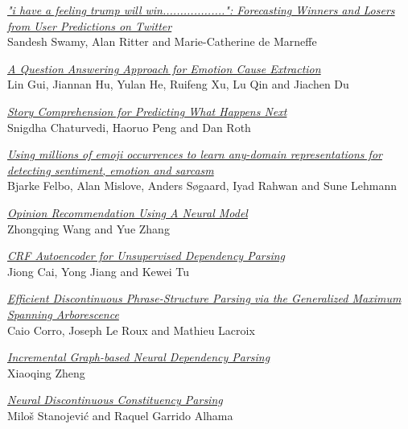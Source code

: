 \hyperlink{page.1582}{\em "i have a feeling trump will win..................": Forecasting Winners and Losers from User Predictions on Twitter}\samepage \\
\hspace*{7mm} Sandesh Swamy, Alan Ritter and Marie-Catherine de Marneffe\dotfill {}

\hyperlink{page.1592}{\em A Question Answering Approach for Emotion Cause Extraction}\samepage \\
\hspace*{7mm} Lin Gui, Jiannan Hu, Yulan He, Ruifeng Xu, Lu Qin and Jiachen Du\dotfill {}

\hyperlink{page.1602}{\em Story Comprehension for Predicting What Happens Next}\samepage \\
\hspace*{7mm} Snigdha Chaturvedi, Haoruo Peng and Dan Roth\dotfill {}

\hyperlink{page.1614}{\em Using millions of emoji occurrences to learn any-domain representations for detecting sentiment, emotion and sarcasm}\samepage \\
\hspace*{7mm} Bjarke Felbo, Alan Mislove, Anders S{\o}gaard, Iyad Rahwan and Sune Lehmann\dotfill {}

\hyperlink{page.1625}{\em Opinion Recommendation Using A Neural Model}\samepage \\
\hspace*{7mm} Zhongqing Wang and Yue Zhang\dotfill {}

\hyperlink{page.1637}{\em CRF Autoencoder for Unsupervised Dependency Parsing}\samepage \\
\hspace*{7mm} Jiong Cai, Yong Jiang and Kewei Tu\dotfill {}

\hyperlink{page.1643}{\em Efficient Discontinuous Phrase-Structure Parsing via the Generalized Maximum Spanning Arborescence}\samepage \\
\hspace*{7mm} Caio Corro, Joseph Le Roux and Mathieu Lacroix\dotfill {}

\hyperlink{page.1654}{\em Incremental Graph-based Neural Dependency Parsing}\samepage \\
\hspace*{7mm} Xiaoqing Zheng\dotfill {}

\hyperlink{page.1665}{\em Neural Discontinuous Constituency Parsing}\samepage \\
\hspace*{7mm} Milo\v{s} Stanojevi\'{c} and Raquel Garrido Alhama\dotfill {}

